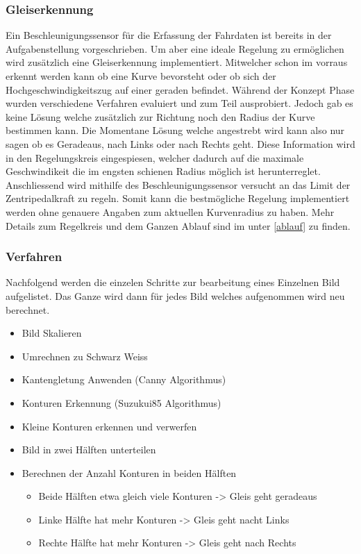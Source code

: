 \documentclass[../../main.tex]{subfiles}
\begin{document}
\subsubsection{Gleiserkennung}
Ein Beschleunigungssensor für die Erfassung der Fahrdaten ist bereits in der Aufgabenstellung vorgeschrieben.
Um aber eine ideale Regelung zu ermöglichen wird zusätzlich eine Gleiserkennung implementiert. Mitwelcher schon im vorraus
erkennt werden kann ob eine Kurve bevorsteht oder ob sich der Hochgeschwindigkeitszug auf einer geraden befindet.
Während der Konzept Phase wurden verschiedene Verfahren evaluiert und zum Teil ausprobiert. Jedoch gab es keine Lösung welche zusätzlich zur Richtung noch den Radius
der Kurve bestimmen kann. Die Momentane Lösung welche angestrebt wird kann also nur sagen ob es Geradeaus, nach Links oder nach Rechts geht.
Diese Information wird in den Regelungskreis eingespiesen, welcher dadurch auf die maximale Geschwindikeit die im engsten schienen Radius möglich ist
herunterreglet. Anschliessend wird mithilfe des Beschleunigungssensor versucht an das Limit der Zentripedalkraft zu regeln. Somit kann die
bestmögliche Regelung implementiert werden ohne genauere Angaben zum aktuellen Kurvenradius zu haben.
Mehr Details zum Regelkreis und dem Ganzen Ablauf sind im unter \ref{ablauf} zu finden.

\subsubsection{Verfahren}
Nachfolgend werden die einzelen Schritte zur bearbeitung eines Einzelnen Bild aufgelistet.
Das Ganze wird dann für jedes Bild welches aufgenommen wird neu berechnet.
\begin{itemize} %
    \item Bild Skalieren
    \item Umrechnen zu Schwarz Weiss
    \item Kantengletung Anwenden (Canny Algorithmus)
    \item Konturen Erkennung (Suzukui85 Algorithmus)
    \item Kleine Konturen erkennen und verwerfen
    \item Bild in zwei Hälften unterteilen
    \item Berechnen der Anzahl Konturen in beiden Hälften
        \begin{itemize}
            \item Beide Hälften etwa gleich viele Konturen -> Gleis geht geradeaus
            \item Linke Hälfte hat mehr Konturen -> Gleis geht nacht Links
            \item Rechte Hälfte hat mehr Konturen -> Gleis geht nach Rechts
        \end{itemize}
\end{itemize}
\end{document}
